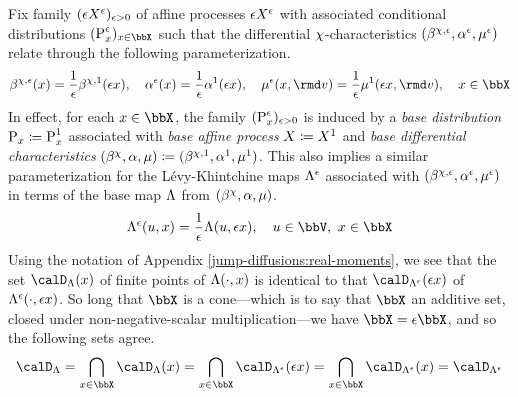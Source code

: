 Fix family $(\epsilon X^\epsilon)_{\epsilon>0}$ of affine processes $\epsilon X^\epsilon$ with associated conditional distributions $(\Prb^\epsilon_\stateVar)_{\stateVar\in\stateSpace}$ such that the differential $\chi$-characteristics $(\beta^{\chi,\epsilon}, \alpha^\epsilon, \mu^\epsilon)$ relate through the following parameterization.
\begin{equation}
  \label{eq:characteristic-asymptotics}
  \affDrift^{\trunc,\epsilon}(\stateVar) = \frac1\epsilon \affDrift^{\trunc,1}(\epsilon\stateVar), \quad
  \affDiff^\epsilon(\stateVar) = \frac1\epsilon \affDiff^1(\epsilon\stateVar), \quad
  \affJump^\epsilon(\stateVar, \rmd\markVar) = \frac1\epsilon \affJump^1(\epsilon\stateVar, \rmd\markVar), \quad \stateVar \in \stateSpace
\end{equation}
In effect, for each $\stateVar \in \stateSpace$, the family $({\operatorname{P}}^\epsilon_x)_{\epsilon>0}$ is induced by a \emph{base distribution} ${\operatorname{P}}_x \coloneqq {\operatorname{P}}^1_x$ associated with \emph{base affine process} $X \coloneqq X^1$ and \emph{base differential characteristics} $(\beta^\chi, \alpha, \mu) \coloneqq (\beta^{\chi,1}, \alpha^1, \mu^1)$.
This also implies a similar parameterization for the L\'evy-Khintchine maps $\Lambda^\epsilon$ associated with $(\beta^{\chi,\epsilon}, \alpha^\epsilon, \mu^\epsilon)$ in terms of the base map $\Lambda$ from $(\beta^\chi, \alpha, \mu)$.
\begin{equation}
  \label{eq:LK-asymptotics}
  \ode^\epsilon(\momentVar, \stateVar) = \frac1\epsilon \ode(\momentVar, \epsilon \stateVar), \quad \momentVar \in \vecSpace, ~ \stateVar \in \stateSpace
\end{equation}
Using the notation of Appendix \ref{jump-diffusions:real-moments}, we see that the set $\odeSpace(\stateVar)$ of finite points of $\Lambda(\cdot, x)$ is identical to that $\odeSpacee(\epsilon\stateVar)$ of $\Lambda^\epsilon(\cdot, \epsilon x)$.
So long that $\stateSpace$ is a cone---which is to say that $\stateSpace$ an additive set, closed under non-negative-scalar multiplication---we have $\stateSpace = \epsilon\stateSpace$, and so the following sets agree.
\begin{equation*}
  \odeSpace = \bigcap_{\stateVar \in \stateSpace} \odeSpace(\stateVar) = \bigcap_{\stateVar \in \stateSpace} \odeSpacee(\epsilon\stateVar) = \bigcap_{\stateVar \in \stateSpace} \odeSpacee(\stateVar) = \odeSpacee
\end{equation*}

